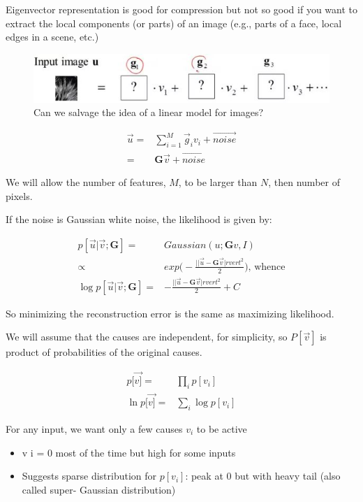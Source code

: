 \documentclass[]{article}
\begin{document}
Eigenvector representation is good for compression but not so good if you want to extract the local components (or parts) of an image (e.g., parts of a face, local edges in a scene, etc.)

\begin{figure}[H]
	\begin{center}
		\caption{Can we salvage the idea of a linear model for images?}
		\includegraphics[width=\textwidth]{linear-model-images}
	\end{center}
\end{figure}

\begin{align*}
	\vec{u} =& \sum_{i=1}^{M} \vec{g}_i v_i + \vec{noise}\\
	=& \mathbf{G} \vec{v} + \vec{noise}
\end{align*} 

We will allow the number of features, $M$, to be larger than $N$, then number of pixels.

If the noise is Gaussian white noise, the likelihood is given by:

\begin{align*}
	p[\vec{u}\vert \vec{v};\mathbf{G}] =& Gaussian(u;\mathbf{G}v,I)\\
	\propto& exp\big(-\frac{\lvert\lvert \vec{u}-\mathbf{G} \vec{v}\rvert rvert^2}{2}\big)\text{, whence}\\
	\log p[\vec{u}\vert \vec{v};\mathbf{G}] =& -\frac{\lvert\lvert \vec{u}-\mathbf{G} \vec{v}\rvert rvert^2}{2} + C
\end{align*}

So minimizing the reconstruction error is the same as maximizing likelihood.

We will assume that the causes are independent, for simplicity, so $P[\vec{v}]$ is product of probabilities of the original causes.

\begin{align*}
	p[\vec{v]} =& \prod_{i} p[v_i]\\
	\ln p[\vec{v]} =& \sum_{i} \log p[v_i]
\end{align*}

For any input, we want only a few causes $v_i$ to be active
\begin{itemize}
	\item v i = 0 most of the time but high for some inputs
	\item Suggests sparse distribution for $p[v_i]$: peak at 0 but with heavy tail (also called super- Gaussian distribution)
\end{itemize}
\end{document}
